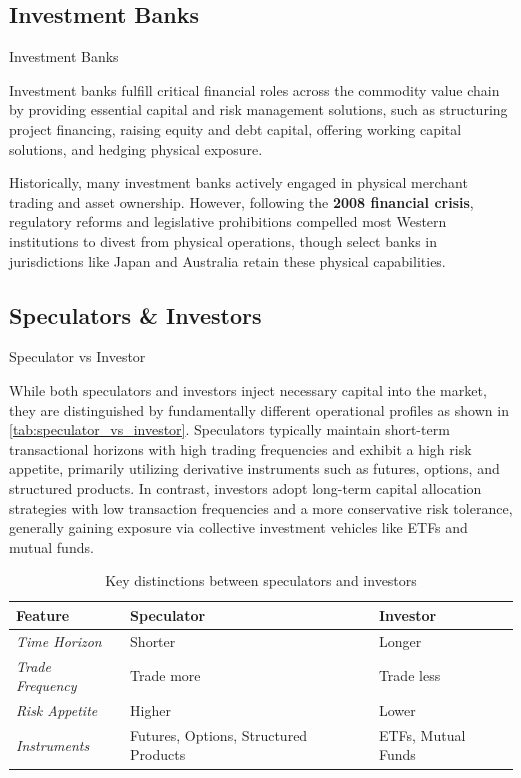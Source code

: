 \documentclass[10pt]{article}
\begin{document}
  \subsection{Investment Banks}

    \begin{core}{Investment Banks}

      Investment banks fulfill critical financial roles across the commodity value chain by providing essential capital and risk management solutions, such as structuring project financing, raising equity and debt capital, offering working capital solutions, and hedging physical exposure.

      Historically, many investment banks actively engaged in physical merchant trading and asset ownership. However, following the \textbf{2008 financial crisis}, regulatory reforms and legislative prohibitions compelled most Western institutions to divest from physical operations, though select banks in jurisdictions like Japan and Australia retain these physical capabilities.

    \end{core}

  \subsection{Speculators \& Investors}

    \begin{core}{Speculator vs Investor}

      While both speculators and investors inject necessary capital into the market, they are distinguished by fundamentally different operational profiles as shown in \autoref{tab:speculator_vs_investor}. Speculators typically maintain short-term transactional horizons with high trading frequencies and exhibit a high risk appetite, primarily utilizing derivative instruments such as futures, options, and structured products. In contrast, investors adopt long-term capital allocation strategies with low transaction frequencies and a more conservative risk tolerance, generally gaining exposure via collective investment vehicles like ETFs and mutual funds.

      \begin{table}[H]
        \centering
        \begin{tabular}{lll}
          \hline
          \textbf{Feature} & \textbf{Speculator} & \textbf{Investor} \\
          \hline
          \textit{Time Horizon} & Shorter & Longer \\
          \textit{Trade Frequency} & Trade more & Trade less \\
          \textit{Risk Appetite} & Higher & Lower \\
          \textit{Instruments} & Futures, Options, Structured Products & ETFs, Mutual Funds \\
          \hline
        \end{tabular}
        \caption{Key distinctions between speculators and investors}
        \label{tab:speculator_vs_investor}
      \end{table}

    \end{core}
\end{document}

